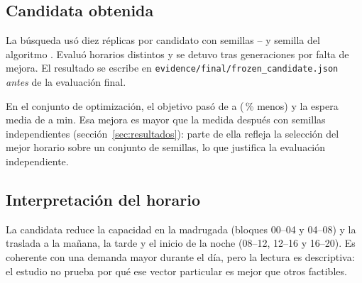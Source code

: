 \begin{table}[ht]
\centering\small
\caption{Configuración del algoritmo genético y de la búsqueda que congeló la candidata.}
\label{tab:ga}

\end{table}

\subsection{Candidata obtenida}
La búsqueda usó diez réplicas por candidato con semillas \OptSeedFirst--\OptSeedLast{} y
semilla del algoritmo \AlgSeed. Evaluó \OptEvaluated{} horarios distintos y se detuvo
tras \OptGenerations{} generaciones por falta de mejora. El resultado se escribe en
\texttt{evidence/final/frozen\_candidate.json} \emph{antes} de la evaluación final.

\begin{table}[ht]
\centering\small
\caption{Horarios comparados (equipos por bloque de cuatro horas). Ambos suman 23
unidades (92 horas-equipo diarias) y cumplen todas las restricciones.}
\label{tab:horarios}

\end{table}

En el conjunto de optimización, el objetivo pasó de \OptObjBase{} a \OptObjCand{}
(\OptRelPct\,\% menos) y la espera media de \OptBaseWait{} a \OptCandWait{} min. Esa
mejora es mayor que la medida después con semillas independientes (sección~\ref{sec:resultados}):
parte de ella refleja la selección del mejor horario sobre un conjunto de semillas, lo que
justifica la evaluación independiente.

\subsection{Interpretación del horario}
La candidata reduce la capacidad en la madrugada (bloques 00--04 y 04--08) y la traslada a
la mañana, la tarde y el inicio de la noche (08--12, 12--16 y 16--20). Es coherente con
una demanda mayor durante el día, pero la lectura es descriptiva: el estudio no prueba por
qué ese vector particular es mejor que otros factibles.
